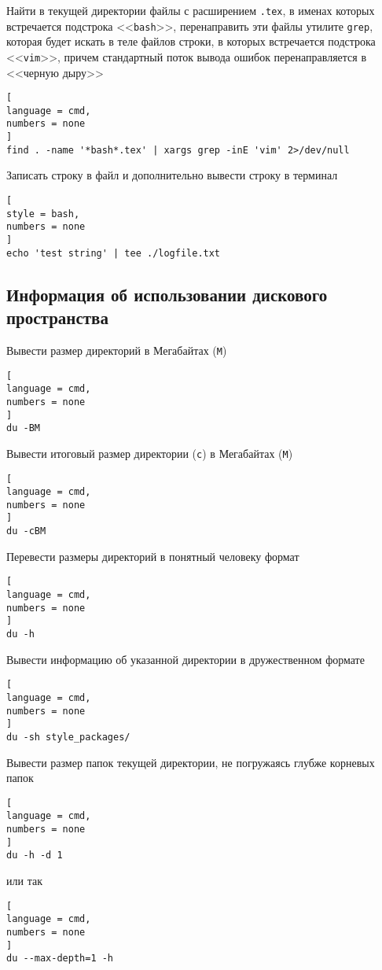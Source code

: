 \documentclass[%
	11pt,
	a4paper,
	utf8,
		]{article}
\begin{document}
Найти в текущей директории файлы с расширением \texttt{.tex}, в именах которых встречается подстрока <<\texttt{bash}>>, перенаправить эти файлы утилите \texttt{grep}, которая будет искать в теле файлов строки, в которых встречается подстрока <<\texttt{vim}>>, причем стандартный поток вывода ошибок перенаправляется в <<черную дыру>>
\begin{lstlisting}[
language = cmd,
numbers = none
]
find . -name '*bash*.tex' | xargs grep -inE 'vim' 2>/dev/null
\end{lstlisting}

Записать строку в файл и дополнительно вывести строку в терминал
\begin{lstlisting}[
style = bash,
numbers = none
]
echo 'test string' | tee ./logfile.txt
\end{lstlisting}

\subsection{Информация об использовании дискового пространства}

Вывести размер директорий в Мегабайтах (\texttt{M})
\begin{lstlisting}[
language = cmd,
numbers = none
]
du -BM
\end{lstlisting}

Вывести итоговый размер директории (\texttt{c}) в Мегабайтах (\texttt{M})
\begin{lstlisting}[
language = cmd,
numbers = none
]
du -cBM
\end{lstlisting}

Перевести размеры директорий в понятный человеку формат
\begin{lstlisting}[
language = cmd,
numbers = none
]
du -h
\end{lstlisting}

Вывести информацию об указанной директории в дружественном формате
\begin{lstlisting}[
language = cmd,
numbers = none
]
du -sh style_packages/
\end{lstlisting}

Вывести размер папок текущей директории, не погружаясь глубже корневых папок
\begin{lstlisting}[
language = cmd,
numbers = none
]
du -h -d 1
\end{lstlisting}
или так
\begin{lstlisting}[
language = cmd,
numbers = none
]
du --max-depth=1 -h
\end{lstlisting}
\end{document}
